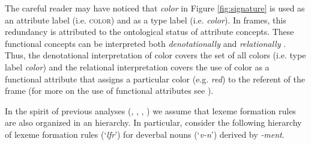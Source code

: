 \documentclass[output=paper]{langsci/langscibook}
\begin{document}
The careful reader may have noticed that \textit{color} in Figure \ref{fig:signature} is used as an attribute label (i.e. \textsc{color}) and as a type label (i.e. \textit{color}). In frames, this redundancy is attributed to the ontological status of attribute concepts. These functional concepts can be interpreted both \textit{denotationally} and \textit{relationally} \citep{Guarino.1992}. Thus, the denotational interpretation of color covers the set of all colors (i.e. type label \textit{color})  and the relational interpretation covers the use of color as a functional attribute that assigns a particular color (e.g. \textit{red}) to the referent of the frame (for more on the use of functional attributes see \citealp{Lobner.2015}).

In the spirit of previous analyses (\citealt{Riehemann.1998}, \citealt{Koenig99}, \citealt{Booij10}, \citealt{Bonami.2016}) we assume that lexeme formation rules are also organized in an  hierarchy. In particular, consider the following  hierarchy of lexeme formation rules (`\textit{lfr}') for deverbal nouns (`\textit{v-n}') derived by \textit{-ment}.

\newsavebox{\xment}
\newsavebox{\evtn}

\newsavebox{\stln}

\newsavebox{\rstn}
\end{document}
